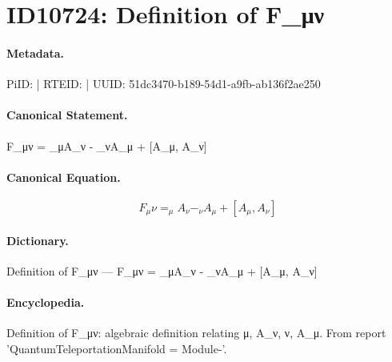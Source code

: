\section*{ID10724: Definition of F\_μν}
\paragraph{Metadata.}
PiID:  | RTEID:  | UUID: 51dc3470-b189-54d1-a9fb-ab136f2ae250

\paragraph{Canonical Statement.}
F\_μν = \_μA\_ν - \_νA\_μ + [A\_μ, A\_ν]

\paragraph{Canonical Equation.}
\[
F_μν = _μA_ν - _νA_μ + [A_μ, A_ν]
\]

\paragraph{Dictionary.}
Definition of F\_μν — F\_μν = \_μA\_ν - \_νA\_μ + [A\_μ, A\_ν]

\paragraph{Encyclopedia.}
Definition of F\_μν: algebraic definition relating μ, A\_ν, ν, A\_μ. From report 'QuantumTeleportationManifold = Module-'.
